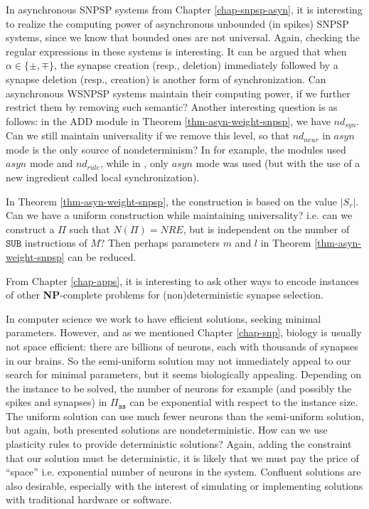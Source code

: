 In asynchronous SNPSP systems from Chapter \ref{chap-snpsp-asyn}, it is interesting to realize the computing power of asynchronous unbounded (in spikes) SNPSP systems, since we know that bounded ones are not universal.
Again, checking the regular expressions in these systems is interesting.
It can be argued that when $\alpha \in \{ \pm, \mp \}$, the synapse creation (resp., deletion) immediately followed by a synapse deletion (resp., creation) is another form of synchronization.
Can asynchronous WSNPSP systems maintain their computing power, if we further restrict them by removing such semantic?
Another interesting question is as follows: in the ADD module in Theorem \ref{thm-asyn-weight-snpsp}, we have $nd_{syn}$.
Can we still maintain universality if we remove this level, so that  $nd_{neur}$ in $asyn$ mode is the only source of nondeterminism?
In \cite{asyn-snp} for example, the modules used $asyn$ mode and $nd_{rule}$, while in \cite{asyn-loc}, only $asyn$ mode  was used (but with the use of a new ingredient called local synchronization).

In Theorem \ref{thm-asyn-weight-snpsp}, the construction is based on the value $|S_r|$.
Can we have a uniform construction while maintaining universality?
i.e. can we construct a $\Pi$ such that $N(\Pi) = NRE$, but is independent on the number of $\mathtt{SUB}$ instructions of $M$?
Then perhaps parameters $m$ and $l$  in Theorem \ref{thm-asyn-weight-snpsp} can be reduced.



From Chapter \ref{chap-apps}, it is interesting to ask other ways to encode instances of other  \textbf{NP}-complete  problems for (non)deterministic synapse selection. 

In computer science we work to have efficient solutions, seeking minimal parameters. 
However, and as we mentioned Chapter \ref{chap-snp}, biology is usually not space efficient: there are billions of neurons, each with thousands of synapses in our brains. 
So the semi-uniform solution may not immediately appeal to our search for minimal parameters, but it seems biologically appealing. 
Depending on the instance to be solved, the number of neurons for example (and possibly the spikes and synapses) in ${\Pi}_{\mathtt{ss}}$ can be exponential with respect to the instance size.
The uniform solution can use much fewer neurons than the semi-uniform solution, but again, both presented solutions are nondeterministic.
How can we use plasticity rules to provide deterministic solutions?
Again, adding the constraint that our solution must be deterministic, it is likely that we must pay the price of ``space'' i.e. exponential number of neurons in the system.
Confluent solutions are also desirable, especially with the interest of simulating or implementing solutions with traditional hardware or software.



